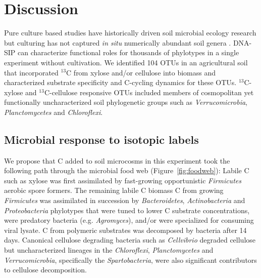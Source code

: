 \section{Discussion} 
Pure culture based studies have historically driven soil microbial ecology
research but culturing has not captured \textit{in situ} numerically abundant
soil genera \citep{Janssen2006}. DNA-SIP can characterize functional roles for
thousands of phylotypes in a single experiment without cultivation. We
identified 104 OTUs in an agricultural soil that incorporated $^{13}$C from
xylose and/or cellulose into biomass and characterized substrate specificity
and C-cycling dynamics for these OTUs. $^{13}$C-xylose and $^{13}$C-cellulose
responsive OTUs included members of cosmopolitan yet functionally
uncharacterized soil phylogenetic groups such as \textit{Verrucomicrobia},
\textit{Planctomycetes} and \textit{Chloroflexi}.

\subsection{Microbial response to isotopic labels}
We propose that C added to soil microcosms in this experiment took the
following path through the microbial food web (Figure~\ref{fig:foodweb}):
Labile C such as xylose was first assimilated by fast-growing opportunistic
\textit{Firmicutes} aerobic spore formers. The remaining labile C biomass
C from growing \textit{Firmicutes} was assimilated in succession by 
\textit{Bacteroidetes}, \textit{Actinobacteria} and \textit{Proteobacteria}
phylotypes that were tuned to lower C substrate concentrations, were
predatory bacteria (e.g. \textit{Agromyces}), and/or were specialized for
consuming viral lysate. C from polymeric substrates was decomposed by bacteria
after 14 days. Canonical cellulose degrading bacteria such as
\textit{Cellvibrio} degraded cellulose but uncharacterized lineages in the
\textit{Chloroflexi}, \textit{Planctomycetes} and \textit{Verrucomicrobia},
specifically the \textit{Spartobacteria}, were also significant contributors to
cellulose decomposition.

